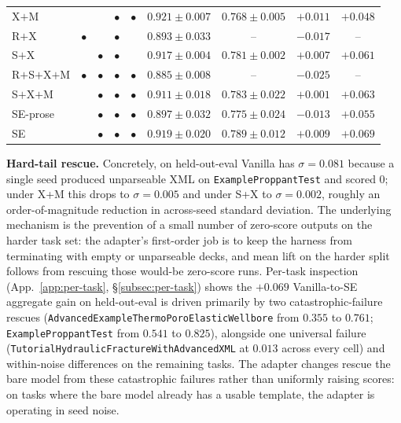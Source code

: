 \documentclass{article}
\begin{document}
\begin{table}[t]
{\begin{tabular}{l|cccc|cccc}
    X$+$M          &         &         & $\bullet$ & $\bullet$ & $\mathbf{0.921 \pm 0.007}$  & $0.768 \pm 0.005$            & $\mathbf{+0.011}$ & $+0.048$          \\
    R$+$X          & $\bullet$ &         & $\bullet$ &         & $0.893 \pm 0.033$           & --                           & $-0.017$          & --                \\
    S$+$X          &         & $\bullet$ & $\bullet$ &         & $0.917 \pm 0.004$           & $0.781 \pm \mathbf{0.002}$   & $+0.007$          & $+0.061$          \\
    R$+$S$+$X$+$M  & $\bullet$ & $\bullet$ & $\bullet$ & $\bullet$ & $0.885 \pm 0.008$           & --                           & $-0.025$          & --                \\
    \midrule
    S$+$X$+$M      &         & $\bullet$ & $\bullet$ & $\bullet$ & $0.911 \pm 0.018$           & $0.783 \pm 0.022$            & $+0.001$          & $+0.063$          \\
    SE-prose       &         & $\bullet$ & $\bullet$ & $\bullet$ & $0.897 \pm 0.032$           & $0.775 \pm 0.024$            & $-0.013$          & $+0.055$          \\
    SE             &         & $\bullet$ & $\bullet$ & $\bullet$ & $0.919 \pm 0.020$           & $\mathbf{0.789 \pm 0.012}$   & $+0.009$          & $\mathbf{+0.069}$ \\
    \bottomrule
  \end{tabular}}
\end{table}

\textbf{Hard-tail rescue.} Concretely, on held-out-eval Vanilla has $\sigma = 0.081$ because a single seed produced unparseable XML on \texttt{ExampleProppantTest} and scored 0; under X+M this drops to $\sigma = 0.005$ and under S+X to $\sigma = 0.002$, roughly an order-of-magnitude reduction in across-seed standard deviation. The underlying mechanism is the prevention of a small number of zero-score outputs on the harder task set: the adapter's first-order job is to keep the harness from terminating with empty or unparseable decks, and mean lift on the harder split follows from rescuing those would-be zero-score runs. Per-task inspection (App.~\ref{app:per-task}, \S\ref{subsec:per-task}) shows the $+0.069$ Vanilla-to-SE aggregate gain on held-out-eval is driven primarily by two catastrophic-failure rescues (\texttt{AdvancedExampleThermoPoroElasticWellbore} from $0.355$ to $0.761$; \texttt{ExampleProppantTest} from $0.541$ to $0.825$), alongside one universal failure (\texttt{TutorialHydraulicFractureWithAdvancedXML} at $0.013$ across every cell) and within-noise differences on the remaining tasks. The adapter changes rescue the bare model from these catastrophic failures rather than uniformly raising scores: on tasks where the bare model already has a usable template, the adapter is operating in seed noise.
\end{document}
